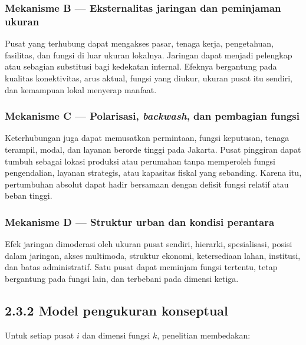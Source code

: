 \documentclass[
  indonesian,
  11pt,
  a4paper,
  oneside,
  openany]{report}
\begin{document}
\subsubsection{Mekanisme B --- Eksternalitas jaringan dan peminjaman
ukuran}\label{mekanisme-b-eksternalitas-jaringan-dan-peminjaman-ukuran}

Pusat yang terhubung dapat mengakses pasar, tenaga kerja, pengetahuan,
fasilitas, dan fungsi di luar ukuran lokalnya. Jaringan dapat menjadi
pelengkap atau sebagian substitusi bagi kedekatan internal. Efeknya
bergantung pada kualitas konektivitas, arus aktual, fungsi yang diukur,
ukuran pusat itu sendiri, dan kemampuan lokal menyerap manfaat.

\subsubsection{\texorpdfstring{Mekanisme C --- Polarisasi,
\emph{backwash}, dan pembagian
fungsi}{Mekanisme C --- Polarisasi, backwash, dan pembagian fungsi}}\label{mekanisme-c-polarisasi-backwash-dan-pembagian-fungsi}

Keterhubungan juga dapat memusatkan permintaan, fungsi keputusan, tenaga
terampil, modal, dan layanan berorde tinggi pada Jakarta. Pusat
pinggiran dapat tumbuh sebagai lokasi produksi atau perumahan tanpa
memperoleh fungsi pengendalian, layanan strategis, atau kapasitas fiskal
yang sebanding. Karena itu, pertumbuhan absolut dapat hadir bersamaan
dengan defisit fungsi relatif atau beban tinggi.

\subsubsection{Mekanisme D --- Struktur urban dan kondisi
perantara}\label{mekanisme-d-struktur-urban-dan-kondisi-perantara}

Efek jaringan dimoderasi oleh ukuran pusat sendiri, hierarki,
spesialisasi, posisi dalam jaringan, akses multimoda, struktur ekonomi,
ketersediaan lahan, institusi, dan batas administratif. Satu pusat dapat
meminjam fungsi tertentu, tetap bergantung pada fungsi lain, dan
terbebani pada dimensi ketiga.

\subsection{2.3.2 Model pengukuran
konseptual}\label{model-pengukuran-konseptual}

Untuk setiap pusat \(i\) dan dimensi fungsi \(k\), penelitian
membedakan:
\end{document}
